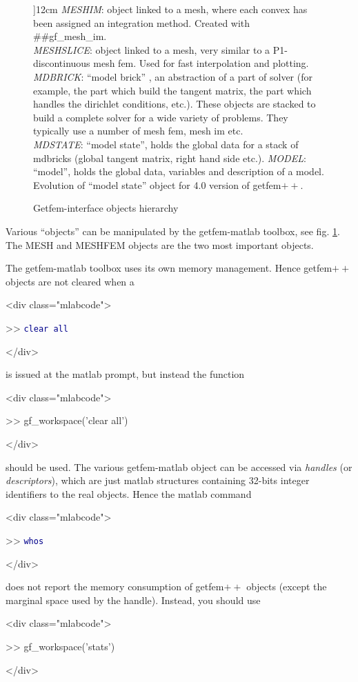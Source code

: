 \documentclass[11pt,a4paper]{article}
\newcommand{\sf}[1]{#1}
\newcommand{\kw}[1]{\textcolor{darkblue}{\texttt{#1}}}
\newenvironment{minipage}[2]{}{}
\newenvironment{matlab}{\begin{rawxml}<div class="mlabcode">\end{rawxml}\begin{example}}{\end{example}\begin{rawxml}</div>\end{rawxml}}
\newcommand{\kw}[1]{\textcolor{darkblue}{\texttt{#1}}}
\newenvironment{matlab}{\begin{alltt}}{\end{alltt}}
\newcommand{\mf}{mesh fem\xspace}
\newcommand{\mim}{mesh im\xspace}
\newcommand{\mlab}{{\sf matlab}\xspace}
\newcommand{\gf}{{\sf getfem${++}$}\xspace}
\newcommand{\Gfi}{{\sf Getfem-interface}\xspace}
\newcommand{\gfm}{{\sf getfem-matlab}\xspace}
\begin{document}
\begin{figure}
\begin{center}
\begin{minipage}[c]{12cm}
  \textit{MESHIM}: object linked to a mesh, where each convex has been
  assigned an integration method. Created with  ##gf\_mesh\_im.\\
  \textit{MESHSLICE}: object linked to a mesh, very similar to a P1-discontinuous \mf. Used for fast interpolation and plotting.\\
   \textit{MDBRICK}: ``model brick'' , an abstraction of a part of solver (for example, the part which build the tangent matrix, the part which handles the dirichlet conditions, etc.). These objects are stacked to build a complete solver for a wide variety of problems. They typically use a number of \mf, \mim etc.\\
   \textit{MDSTATE}: ``model state'', holds the global data for a stack of mdbricks (global tangent matrix, right hand side etc.). 
   \textit{MODEL}: ``model'', holds the global data, variables and description of a model. Evolution of ``model state'' object for 4.0 version of \gf.
\T \end{minipage}
\T \end{center}
\caption{\Gfi objects hierarchy}\label{fig:hierarchy}
\end{figure}
Various ``objects'' can be manipulated by the \gfm toolbox, see fig. \ref{fig:hierarchy}. The MESH and MESHFEM objects are the two most important objects. 

The \gfm toolbox uses its own memory management. Hence \gf objects are
not cleared when a 
\begin{matlab}
>> \kw{clear all}
\end{matlab}
is issued at the \mlab prompt, but
instead the function 
\begin{matlab}
>> gf\_workspace('clear all')
\end{matlab}
should be used. The various \gfm object can be accessed via \textit{handles} (or
\textit{descriptors}), which are just \mlab structures containing 32-bits integer identifiers to
the real objects. Hence the \mlab command 
\begin{matlab}
>> \kw{whos}
\end{matlab}
does not report the memory consumption of \gf objects (except the marginal space
 used by the handle). Instead, you should use
\begin{matlab}
>> gf\_workspace('stats')
\end{matlab}
\end{document}
